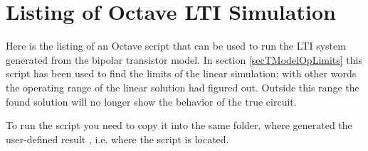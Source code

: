 \chapter{Listing of Octave LTI Simulation}
\label{secListingOctaveSimulation}

Here is the listing of an Octave script that can be used to run the LTI
system generated from the bipolar transistor model. In section
\ref{secTModelOpLimits} this script has been used to find the limits of
the linear simulation; with other words the operating range of the
linear solution \linnet{} had figured out. Outside this range the found
solution will no longer show the behavior of the true circuit.

To run the script you need to copy it into the same folder, where
\linnet{} generated the user-defined result , i.e. where the
script  is located.

%


